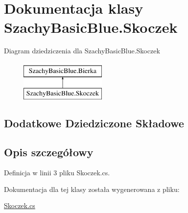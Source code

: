 \hypertarget{class_szachy_basic_blue_1_1_skoczek}{\section{Dokumentacja klasy Szachy\-Basic\-Blue.\-Skoczek}
\label{class_szachy_basic_blue_1_1_skoczek}
}
Diagram dziedziczenia dla Szachy\-Basic\-Blue.\-Skoczek\begin{figure}[H]
\begin{center}
\leavevmode
\includegraphics[height=2.000000cm]{class_szachy_basic_blue_1_1_skoczek}
\end{center}
\end{figure}
\subsection*{Dodatkowe Dziedziczone Składowe}


\subsection{Opis szczegółowy}


Definicja w linii 3 pliku Skoczek.\-cs.



Dokumentacja dla tej klasy została wygenerowana z pliku\-:\begin{DoxyCompactItemize}
\item 
\hyperlink{_skoczek_8cs}{Skoczek.\-cs}\end{DoxyCompactItemize}
